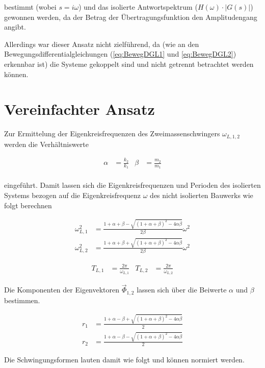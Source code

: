 bestimmt (wobei $s = i \omega$) und das isolierte Antwortspektrum ($H(\omega) \cdot |G(s)|$) gewonnen werden, da der Betrag der Übertragungsfunktion den Amplitudengang angibt.

Allerdings war dieser Ansatz nicht zielführend, da (wie an den Bewegungsdifferentialgleichungen (\cref{eq:BewegDGL1} und \cref{eq:BewegDGL2}) erkennbar ist) die Systeme gekoppelt sind und nicht getrennt betrachtet werden können.

\section{Vereinfachter Ansatz}
\label{sec:ansatzvereinfacht}

Zur Ermittelung der Eigenkreisfrequenzen des Zweimassenschwingers $\omega_{L,1,2}$ werden die Verhältniswerte

\begin{align}
\alpha &= \frac{k_2}{k_1} & \beta  &= \frac{m_2}{m_1} \\
\end{align}

eingeführt. Damit lassen sich die Eigenkreisfrequenzen und Perioden des isolierten Systems bezogen auf die Eigenkreisfrequenz $\omega$ des nicht isolierten Bauwerks wie folgt berechnen \cite{Pocanschi} \cite{Isemann}

\begin{align}
\omega_{L,1}^2 &= \frac{1 + \alpha + \beta - \sqrt{(1 + \alpha + \beta)^2 - 4 \alpha \beta}}{2 \beta} \omega^2\\
\omega_{L,2}^2 &= \frac{1 + \alpha + \beta + \sqrt{(1 + \alpha + \beta)^2 - 4 \alpha \beta}}{2 \beta} \omega^2
\end{align}

\begin{align}
T_{L,1} &= \frac{2 \pi}{\omega_{L,1}} & T_{L,2} &= \frac{2 \pi}{\omega_{L,2}}
\end{align}

Die Komponenten der Eigenvektoren $\vec{\Phi}_{1,2}$ lassen sich über die Beiwerte $\alpha$ und $\beta$ bestimmen.

\begin{align}
r_1 &= \frac{1 + \alpha - \beta + \sqrt{(1 + \alpha + \beta)^2 - 4 \alpha \beta}}{2}\\
r_2 &= \frac{1 + \alpha - \beta - \sqrt{(1 + \alpha + \beta)^2 - 4 \alpha \beta}}{2}
\end{align}

Die Schwingungsformen lauten damit wie folgt und können normiert werden.

